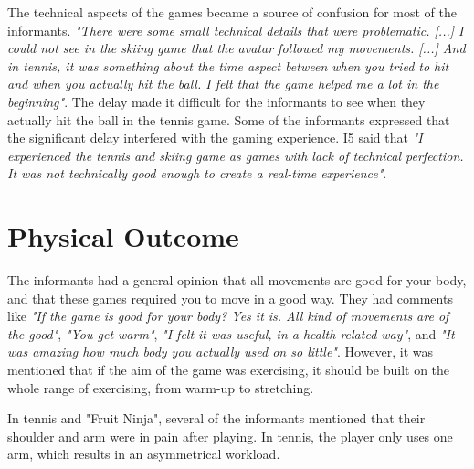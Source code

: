 The technical aspects of the games became a source of confusion for most of the informants. \emph{"There were some small technical details that were problematic. [...] I could not see in the skiing game that the avatar followed my movements. [...] And in tennis, it was something about the time aspect between when you tried to hit and when you actually hit the ball. I felt that the game helped me a lot in the beginning"}. The delay made it difficult for the informants to see when they actually hit the ball in the tennis game. Some of the informants expressed that the significant delay interfered with the gaming experience. I5 said that \emph{"I experienced the tennis and skiing game as games with lack of technical perfection. It was not technically good enough to create a real-time experience"}. 

\section{Physical Outcome}

The informants had a general opinion that all movements are good for your body, and that these games required you to move in a good way. They had comments like \emph{"If the game is good for your body? Yes it is. All kind of movements are of the good"}, \emph{"You get warm"}, \emph{"I felt it was useful, in a health-related way"}, and \emph{"It was amazing how much body you actually used on so little"}. However, it was mentioned that if the aim of the game was exercising, it should be built on the whole range of exercising, from warm-up to stretching. 

In tennis and "Fruit Ninja", several of the informants mentioned that their shoulder and arm were in pain after playing. In tennis, the player only uses one arm, which results in an asymmetrical workload.  
    
